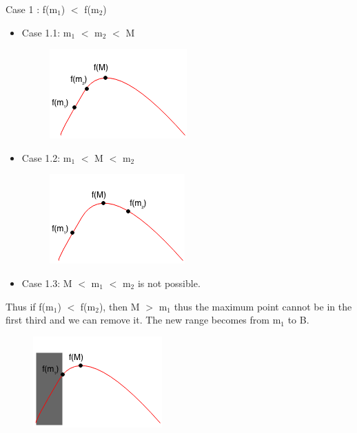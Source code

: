 \documentclass[11pt,oneside]{book}
\makeatletter
\def\maxwidth#1{\ifdim\Gin@nat@width>#1 #1\else\Gin@nat@width\fi}
\makeatother
\begin{document}
Case 1 : f(m$_{1}$) $<$ f(m$_{2}$)

\begin{itemize}
\item Case 1.1:  m$_{1}$ $<$ m$_{2}$ $<$ M

\vspace{5px}\begin{figure}[H]\centering
        \includegraphics[width=0.66\maxwidth{\textwidth}]{ternarycase11.png}
        \end{figure}
\item Case 1.2: m$_{1}$ $<$ M $<$ m$_{2}$

\vspace{5px}\begin{figure}[H]\centering
        \includegraphics[width=0.66\maxwidth{\textwidth}]{ternarycase12.png}
        \end{figure}
\item Case 1.3: M $<$ m$_{1}$ $<$ m$_{2}$ is not possible.
\end{itemize}

Thus if f(m$_{1}$) $<$ f(m$_{2}$), then M $>$ m$_{1}$ thus the maximum point cannot be in the first third and we can remove it. The new range becomes from m$_{1}$ to B.

\vspace{5px}\begin{figure}[H]\centering
        \includegraphics[width=0.66\maxwidth{\textwidth}]{ternarycase1.png}
        \end{figure}
\end{document}
